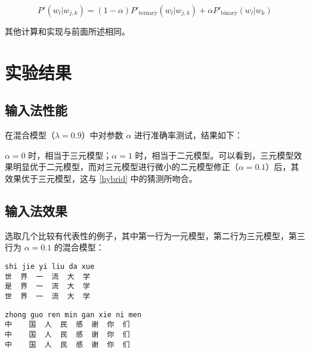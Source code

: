 \documentclass[a4paper]{article}
\begin{document}
\begin{equation}
    P'(w_{l}|w_{j,k}) = (1-\alpha)P'_{\textrm{ternary}}(w_{l}|w_{j,k})
        + \alpha P'_{\textrm{binary}}(w_{l}|w_{k})
\end{equation}

其他计算和实现与前面所述相同。

\section{实验结果}

\subsection{输入法性能}

在混合模型（$\lambda=0.9$）中对参数 $\alpha$ 进行准确率测试，结果如下：

\par

$\alpha=0$ 时，相当于三元模型；$\alpha=1$ 时，相当于二元模型。可以看到，三元模型效果明显优于二元模型，而对三元模型进行微小的二元模型修正（$\alpha=0.1$）后，其效果优于三元模型，这与 \ref{hybrid} 中的猜测所吻合。

\subsection{输入法效果}

选取几个比较有代表性的例子，其中第一行为一元模型，第二行为三元模型，第三行为 $\alpha=0.1$ 的混合模型：

\begin{lstlisting}
shi jie yi liu da xue
世  界  一  流  大  学
是  界  一  流  大  学
世  界  一  流  大  学
\end{lstlisting}

\begin{lstlisting}
zhong guo ren min gan xie ni men
中    国  人  民  感  谢  你  们
中    国  人  民  感  谢  你  们
中    国  人  民  感  谢  你  们
\end{lstlisting}
\end{document}
